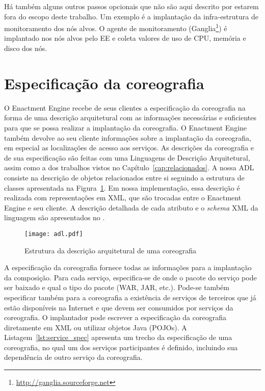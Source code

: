 Há também alguns outros passos opcionais que não são aqui descrito por estarem fora
do escopo deste trabalho. Um exemplo é a implantação da infra-estrutura de monitoramento
dos nós alvos. O agente de monitoramento 
(Ganglia\footnote{\url{http://ganglia.sourceforge.net}})
é implantado nos nós alvos pelo EE e
coleta valores de uso de CPU, memória e disco dos nós.

\section{Especificação da coreografia}
\label{sec:spec}

O Enactment Engine recebe de seus clientes a especificação da coreografia na forma 
de uma descrição arquitetural com as informações necessárias e suficientes para 
que se possa realizar a implantação da coreografia. 
O Enactment Engine também devolve ao seu cliente informações sobre a implantação da coreografia, 
em especial as localizações de acesso aos serviços. As descrições da coreografia e de sua 
especificação são feitas com uma Linguagens de Descrição Arquitetural, assim como a dos trabalhos vistos no Capítulo~\ref{cap:relacionados}. 
A nossa ADL consiste na descrição de objetos relacionados entre si seguindo 
a estrutura de classes apresentada na Figura~\ref{fig:adl}. 
Em nossa implementação, essa descrição é realizada com representações em XML, 
que são trocadas entre o Enactment Engine e seu cliente. 
A descrição detalhada de cada atributo e o \emph{schema} XML da linguagem
são apresentados no \userguide.

\begin{figure}[!h]
  \centering
  \texttt{[image: adl.pdf]} 
  \caption{Estrutura da descrição arquitetural de uma coreografia}
  \label{fig:adl} 
\end{figure}


A especificação da coreografia fornece todas as informações para a implantação da composição.
Para cada serviço, especifica-se de onde o pacote do serviço pode ser baixado
e qual o tipo do pacote (WAR, JAR, etc.).
Pode-se também especificar também para a coreografia a existência de serviços
de terceiros que já estão disponíveis na Internet e que devem
ser consumidos por serviços da coreografia.
O implantador pode escrever a especificação da coreografia diretamente em XML
ou utilizar objetos Java (POJOs).
A Listagem~\ref{lst:service_spec} apresenta um trecho da especificação de uma coreografia,
no qual um dos serviços participantes é definido,
incluindo sua dependência de outro serviço da coreografia.

